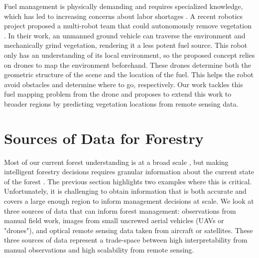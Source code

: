 Fuel management is physically demanding and requires specialized knowledge, which has led to increasing concerns about labor shortages \cite{CommisionGlobalDivision}. 
A recent robotics project proposed a multi-robot team that could autonomously remove vegetation \cite{couceiro2019semfire}. In their work, an unmanned ground vehicle can traverse the environment and mechanically grind vegetation, rendering it a less potent fuel source. This robot only has an understanding of its local environment, so the proposed concept relies on drones to map the environment beforehand. These drones determine both the geometric structure of the scene and the location of the fuel. This helps the robot avoid obstacles and determine where to go, respectively. Our work tackles this fuel mapping problem from the drone and proposes to extend this work to broader regions by predicting vegetation locations from remote sensing data. 


\section{Sources of Data for Forestry}
Most of our current forest understanding is at a broad scale \cite{Oswalt2014Update:}, but making intelligent forestry decisions requires granular information about the current state of the forest \cite{digitalForestry2009, Hogland2014EstimatingArcObjects}. The previous section highlights two examples where this is critical. Unfortunately, it is challenging to obtain information that is both accurate and covers a large enough region to inform management decisions at scale. We look at three sources of data that can inform forest management: observations from manual field work, images from small uncrewed aerial vehicles (UAVs or "drones"), and optical remote sensing data taken from aircraft or satellites. These three sources of data represent a trade-space between high interpretability from manual observations and high scalability from remote sensing.


